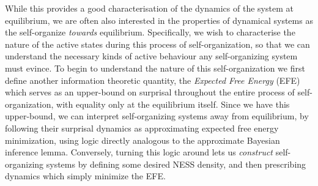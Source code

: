 While this provides a good characterisation of the dynamics of the system at equilibrium, we are often also interested in the properties of dynamical systems as the self-organize \emph{towards} equilibrium. Specifically, we wish to characterise the nature of the active states during this process of self-organization, so that we can understand the necessary kinds of active behaviour any self-organizing system must evince. To begin to understand the nature of this self-organization we first define another information theoretic quantity, the \emph{Expected Free Energy} (EFE) which serves as an upper-bound on surprisal throughout the entire process of self-organization, with equality only at the equilibrium itself. Since we have this upper-bound, we can interpret self-organizing systems away from equilibrium, by following their surprisal dynamics as approximating expected free energy minimization, using logic directly analogous to the approximate Bayesian inference lemma. Conversely, turning this logic around lets us \emph{construct} self-organizing systems by defining some desired NESS density, and then prescribing dynamics which simply minimize the EFE.

